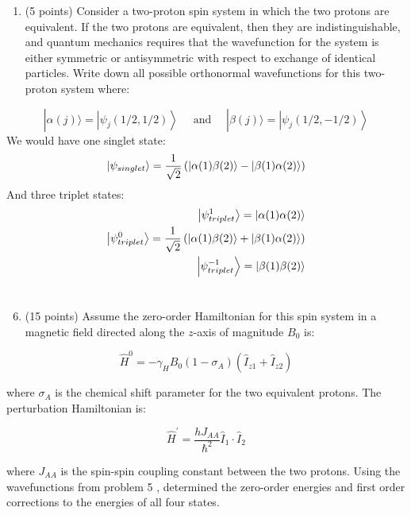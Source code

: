 \documentclass[12pt]{article}
\begin{document}
\begin{enumerate}
\begin{lstlisting}[language=Python]
\end{lstlisting}

  \item (5 points) Consider a two-proton spin system in which the two protons are equivalent. If the two protons are equivalent, then they are indistinguishable, and quantum mechanics requires that the wavefunction for the system is either symmetric or antisymmetric with respect to exchange of identical particles. Write down all possible orthonormal wavefunctions for this two-proton system where:

\end{enumerate}

$$
|\alpha(j)\rangle=\left|\psi_{j}(1 / 2,1 / 2)\right\rangle \quad \text { and } \quad|\beta(j)\rangle=\left|\psi_{j}(1 / 2,-1 / 2)\right\rangle
$$
We would have one singlet state:
\begin{equation}
  \ket{\psi_{singlet}} = \frac{1}{\sqrt{2}} \left( \ket{\alpha(1)\beta(2)} - \ket{\beta(1)\alpha(2)} \right)
\end{equation}
And three triplet states:
\begin{align}
  \ket{\psi_{triplet}^{1}} = \ket{\alpha(1)\alpha(2)}\\
  \ket{\psi_{triplet}^{0}} = \frac{1}{\sqrt{2}} \left( \ket{\alpha(1)\beta(2)} + \ket{\beta(1)\alpha(2)} \right)\\
  \ket{\psi_{triplet}^{-1}} = \ket{\beta(1)\beta(2)}
\end{align}
\section{}
\begin{enumerate}
  \setcounter{enumi}{5}
  \item (15 points) Assume the zero-order Hamiltonian for this spin system in a magnetic field directed along the $z$-axis of magnitude $B_{0}$ is:
\end{enumerate}

$$
\widehat{H}^{0}=-\gamma_{H} B_{0}\left(1-\sigma_{A}\right)\left(\hat{I}_{z 1}+\hat{I}_{z 2}\right)
$$

where $\sigma_{A}$ is the chemical shift parameter for the two equivalent protons. The perturbation Hamiltonian is:

$$
\widehat{H}^{\prime}=\frac{h J_{A A}}{\hbar^{2}} \hat{I}_{1} \cdot \hat{I}_{2}
$$

where $J_{A A}$ is the spin-spin coupling constant between the two protons. Using the wavefunctions from problem 5 , determined the zero-order energies and first order corrections to the energies of all four states.
\end{document}
